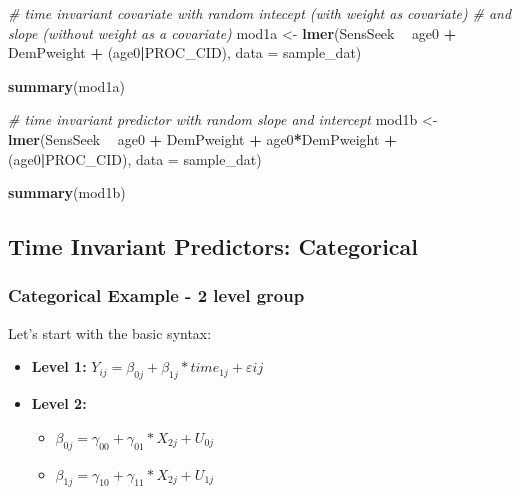 \documentclass[]{article}
\newenvironment{Shaded}{\begin{snugshade}}{\end{snugshade}}
\newcommand{\KeywordTok}[1]{\textcolor[rgb]{0.13,0.29,0.53}{\textbf{#1}}}
\newcommand{\DataTypeTok}[1]{\textcolor[rgb]{0.13,0.29,0.53}{#1}}
\newcommand{\StringTok}[1]{\textcolor[rgb]{0.31,0.60,0.02}{#1}}
\newcommand{\CommentTok}[1]{\textcolor[rgb]{0.56,0.35,0.01}{\textit{#1}}}
\newcommand{\OperatorTok}[1]{\textcolor[rgb]{0.81,0.36,0.00}{\textbf{#1}}}
\newcommand{\NormalTok}[1]{#1}
\begin{document}
\begin{Shaded}
\begin{Highlighting}[]
\CommentTok{# time invariant covariate with random intecept (with weight as covariate) }
\CommentTok{# and slope (without weight as a covariate)}
\NormalTok{mod1a <-}\StringTok{ }\KeywordTok{lmer}\NormalTok{(SensSeek }\OperatorTok{~}\StringTok{ }\NormalTok{age0 }\OperatorTok{+}\StringTok{ }\NormalTok{DemPweight }\OperatorTok{+}\StringTok{ }\NormalTok{(age0}\OperatorTok{|}\NormalTok{PROC_CID), }
              \DataTypeTok{data =}\NormalTok{ sample_dat)}

\KeywordTok{summary}\NormalTok{(mod1a)}

\CommentTok{# time invariant predictor with random slope and intercept}
\NormalTok{mod1b <-}\StringTok{ }\KeywordTok{lmer}\NormalTok{(SensSeek }\OperatorTok{~}\StringTok{ }\NormalTok{age0 }\OperatorTok{+}\StringTok{ }\NormalTok{DemPweight }\OperatorTok{+}\StringTok{ }\NormalTok{age0}\OperatorTok{*}\NormalTok{DemPweight }\OperatorTok{+}\StringTok{ }
\StringTok{                }\NormalTok{(age0}\OperatorTok{|}\NormalTok{PROC_CID), }\DataTypeTok{data =}\NormalTok{ sample_dat)}

\KeywordTok{summary}\NormalTok{(mod1b)}
\end{Highlighting}
\end{Shaded}

\normalsize

\subsection{Time Invariant Predictors:
Categorical}\label{time-invariant-predictors-categorical}

\subsubsection{Categorical Example - 2 level
group}\label{categorical-example---2-level-group}

Let's start with the basic syntax:

\begin{itemize}
  \item \textbf{Level 1:} $Y_{ij} = \beta_{0j} + \beta_{1j}*time_{1j} + \varepsilon{ij}$
  \item \textbf{Level 2:} 
    \begin{itemize} 
      \item $\beta_{0j} = \gamma_{00} + \gamma_{01}*X_{2j} + U_{0j}$
      \item $\beta_{1j} = \gamma_{10} + \gamma_{11}*X_{2j} + U_{1j}$
    \end{itemize}
\end{itemize}
\end{document}

